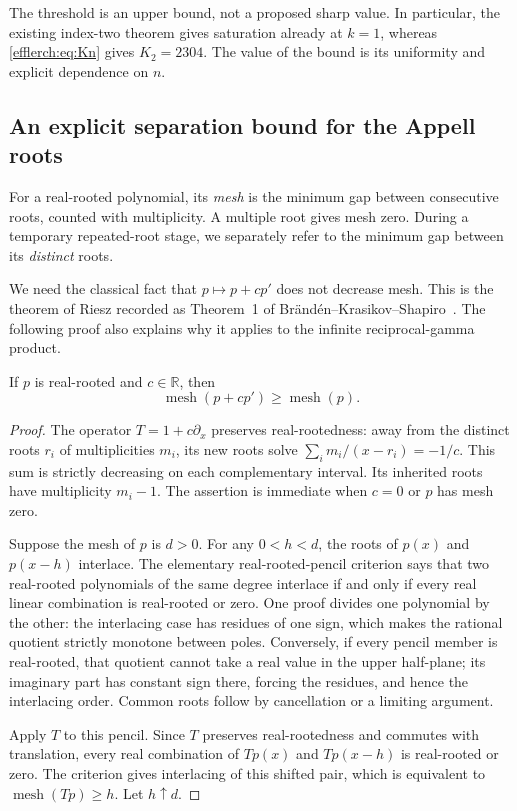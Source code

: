 The threshold is an upper bound, not a proposed sharp value.  In particular,
the existing index-two theorem gives saturation already at $k=1$, whereas
\eqref{efflerch:eq:Kn} gives $K_2=2304$.  The value of the bound is its
uniformity and explicit dependence on $n$.

\subsection{An explicit separation bound for the Appell roots}

For a real-rooted polynomial, its \emph{mesh} is the minimum gap between
consecutive roots, counted with multiplicity.  A multiple root gives mesh
zero.  During a temporary repeated-root stage, we separately refer to
the minimum gap between its \emph{distinct} roots.

We need the classical fact that $p\mapsto p+cp'$ does not decrease
mesh.  This is the theorem of Riesz recorded as Theorem~1 of
Br\"and\'en--Krasikov--Shapiro~\cite{efflerch:BKS}.  The following proof
also explains why it applies to the infinite reciprocal-gamma product.

\begin{lemma}
\label{efflerch:lem:mesh-preserve}
If $p$ is real-rooted and $c\in\mathbb R$, then
\[
 \operatorname{mesh}(p+cp')\geq\operatorname{mesh}(p).
\]
\end{lemma}
\begin{proof}
The operator $T=1+c\partial_x$ preserves real-rootedness: away from
the distinct roots $r_i$ of multiplicities $m_i$, its new roots solve
$\sum_i m_i/(x-r_i)=-1/c$.  This sum is strictly decreasing on each
complementary interval.  Its inherited roots have multiplicity $m_i-1$.
The assertion is immediate when $c=0$ or $p$ has mesh zero.

Suppose the mesh of $p$ is $d>0$.  For any $0<h<d$, the roots of $p(x)$
and $p(x-h)$ interlace.  The elementary real-rooted-pencil criterion
says that two real-rooted polynomials of the same degree interlace
if and only if every real linear combination is real-rooted or zero.
One proof divides one polynomial by the other: the interlacing case
has residues of one sign, which makes the rational quotient strictly
monotone between poles.  Conversely, if every pencil member is
real-rooted, that quotient cannot take a real value in the upper
half-plane; its imaginary part has constant sign there, forcing the
residues, and hence the interlacing order.  Common roots follow by
cancellation or a limiting argument.

Apply $T$ to this pencil.  Since $T$ preserves real-rootedness and
commutes with translation, every real combination of $Tp(x)$ and
$Tp(x-h)$ is real-rooted or zero.  The criterion gives interlacing
of this shifted pair, which is equivalent to
$\operatorname{mesh}(Tp)\geq h$.  Let $h\uparrow d$.
\end{proof}

